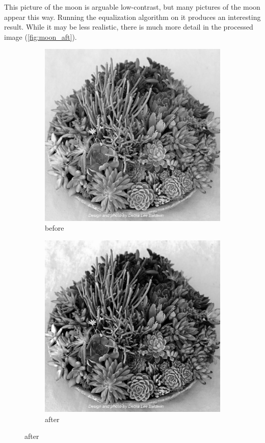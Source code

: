 \documentclass[11pt,a4paper]{article}
\begin{document}
This picture of the moon is arguable low-contrast, but many pictures of the moon appear this way. Running the equalization algorithm on it produces an interesting result. While it may be less realistic, there is much more detail in the processed image (\ref{fig:moon_aft}).

\begin{figure}[ht]
	\centering
	\begin{subfigure}[h]{0.45\textwidth}
		\includegraphics[width=\textwidth]{figs/succs_gray}
		\caption{before}
		\label{fig:succs_bef}
	\end{subfigure}
	\begin{subfigure}[h]{0.45\textwidth}
		\includegraphics[width=\textwidth]{figs/succs_ce}
		\caption{after}
		\label{fig:succs_aft}
	\end{subfigure}
	

\end{figure}
\end{document}
